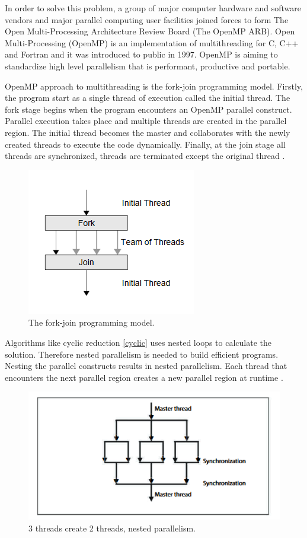 \documentclass[12pt, oneside]{book}
\theoremstyle{plain}
\theoremstyle{definition}
\begin{document}
In order to solve this problem, a group of major computer hardware and software vendors and major parallel computing user facilities joined forces to form The Open Multi-Processing Architecture Review Board (The OpenMP ARB)\cite{openmpfaq}. Open Multi-Processing (OpenMP) is an implementation of multithreading for C, C++ and Fortran and it was introduced to public in 1997. OpenMP is aiming to standardize high level parallelism that is performant, productive and portable.

 OpenMP approach to multithreading is the fork-join programming model. Firstly, the program start as a single thread of execution called the initial thread. The fork stage begins when the program encounters an OpenMP parallel construct. Parallel execution takes place and multiple threads are created in the parallel region. The initial thread becomes the master and collaborates with the newly created threads to execute the code dynamically. Finally, at the join stage all threads are synchronized, threads are terminated except the original thread \cite{openmp}.

\begin{figure}[!htb]
    \centering
        \includegraphics[scale=0.7]{openmp.png}
    \caption{The fork-join programming model.}
\end{figure}

Algorithms like cyclic reduction \ref{cyclic} uses nested loops to calculate the solution. Therefore nested parallelism is needed to build efficient programs. Nesting the parallel constructs results in nested parallelism. Each thread that encounters the next parallel region creates a new parallel region at runtime \cite{openmpnext}.

\begin{figure}[!htb]
    \centering
        \includegraphics[scale=0.7]{openmpnested.png}
    \caption{3 threads create 2 threads, nested parallelism.}
\end{figure}
\end{document}
